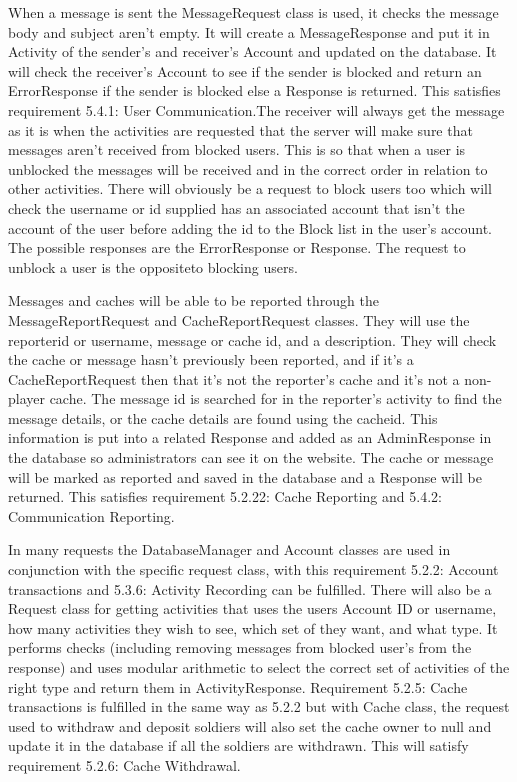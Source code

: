 When a message is sent the MessageRequest class is used, it checks the message body and subject aren't empty. It will create a MessageResponse and put it in Activity of the sender's and receiver's Account and updated on the database. It will check the receiver's Account to see if the sender is blocked and return an ErrorResponse if the sender is blocked else a Response is returned. This satisfies requirement 5.4.1: User Communication.The receiver will always get the message as it is when the activities are requested that the server will make sure that messages aren't received from blocked users. This is so that when a user is unblocked the messages will be received and in the correct order in relation to other activities. There will obviously be a request to block users too which will check the username or id supplied has an associated account that isn't the account of the user before adding the id to the Block list in the user's account. The possible responses are the ErrorResponse or Response. The request to unblock a user is the oppositeto blocking users.

Messages and caches will be able to be reported through the MessageReportRequest and CacheReportRequest classes. They will use the reporterid or username, message or cache id, and a description. They will check the cache or message hasn't previously been reported, and if it's a CacheReportRequest then that it's not the reporter's cache and it's not a non-player cache. The message id is searched for in the reporter's activity to find the message details, or the cache details are found using the cacheid. This information is put into a related Response and added as an AdminResponse in the database so administrators can see it on the website. The cache or message will be marked as reported and saved in the database and a Response will be returned. This satisfies requirement 5.2.22: Cache Reporting and 5.4.2: Communication Reporting.

In many requests the DatabaseManager and Account classes are used in conjunction with the specific request class, with this requirement 5.2.2: Account transactions and 5.3.6: Activity Recording can be fulfilled. There will also be a Request class for getting activities that uses the users Account ID or username, how many activities they wish to see, which set of they want, and what type. It performs checks (including removing messages from blocked user's from the response) and uses modular arithmetic to select the correct set of activities of the right type and return them in ActivityResponse. Requirement 5.2.5: Cache transactions is fulfilled in the same way as 5.2.2 but with Cache class, the request used to withdraw and deposit soldiers will also set the cache owner to null and update it in the database if all the soldiers are withdrawn. This will satisfy requirement 5.2.6: Cache Withdrawal.


